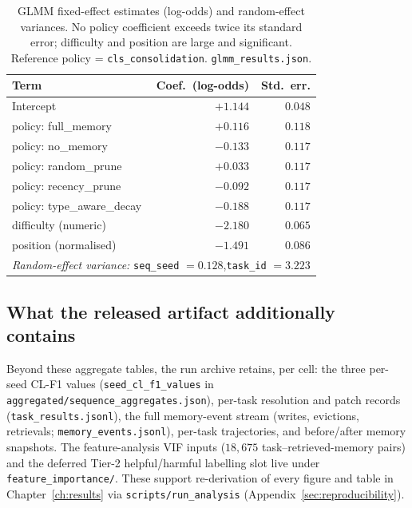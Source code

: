 \begin{table}[htbp]
  \centering
  \caption{GLMM fixed-effect estimates (log-odds) and random-effect variances. No policy
  coefficient exceeds twice its standard error; difficulty and position are large and
  significant. Reference policy = \texttt{cls\_consolidation}. \texttt{glmm\_results.json}.}
  \label{tab:glmm-spec}
  \begin{tabular}{lrr}
    \toprule
    Term & Coef.\ (log-odds) & Std.\ err. \\
    \midrule
    Intercept                          & $+1.144$ & $0.048$ \\
    policy: full\_memory               & $+0.116$ & $0.118$ \\
    policy: no\_memory                 & $-0.133$ & $0.117$ \\
    policy: random\_prune              & $+0.033$ & $0.117$ \\
    policy: recency\_prune             & $-0.092$ & $0.117$ \\
    policy: type\_aware\_decay         & $-0.188$ & $0.117$ \\
    difficulty (numeric)               & $-2.180$ & $0.065$ \\
    position (normalised)              & $-1.491$ & $0.086$ \\
    \midrule
    \multicolumn{3}{l}{\emph{Random-effect variance:}\quad
      \texttt{seq\_seed} $=0.128$,\quad \texttt{task\_id} $=3.223$} \\
    \bottomrule
  \end{tabular}
\end{table}

\subsection{What the released artifact additionally contains}

Beyond these aggregate tables, the run archive retains, per cell: the three per-seed CL-F1
values (\texttt{seed\_cl\_f1\_values} in \texttt{aggregated/sequence\_aggregates.json}),
per-task resolution and patch records (\texttt{task\_results.jsonl}), the full memory-event
stream (writes, evictions, retrievals; \texttt{memory\_events.jsonl}), per-task trajectories,
and before/after memory snapshots. The feature-analysis VIF inputs ($18{,}675$
task--retrieved-memory pairs) and the deferred Tier-2 helpful/harmful labelling slot live under
\texttt{feature\_importance/}. These support re-derivation of every figure and table in
Chapter~\ref{ch:results} via \texttt{scripts/run\_analysis} (Appendix~\ref{sec:reproducibility}).

